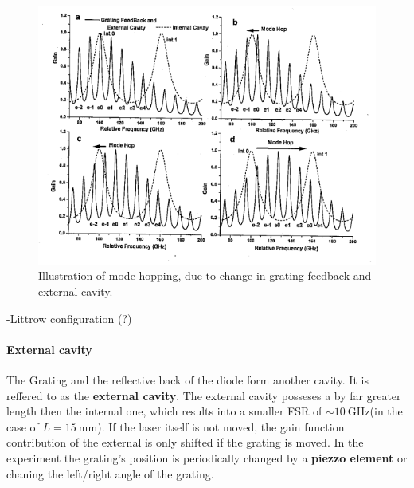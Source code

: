 \FloatBarrier
\begin{figure}
  \includegraphics{mode_hops.png}
  \caption{Illustration of mode hopping, due to change in grating feedback and external cavity.\cite{sample}}
  \label{fig:mode_hops}
\end{figure}
\FloatBarrier


-Littrow configuration (?)


\paragraph{External cavity}
The Grating and the reflective back of the diode form another
cavity. It is reffered to as the \textbf{external cavity}.
The external cavity posseses a by far greater length then
the internal one, which results into a
smaller FSR of
$\sim \SI{10}{\giga\hertz}$(in the case of $L = \SI{15}{\milli\meter}$).
If the laser itself is not moved, the gain function
contribution of the external is only shifted if the grating
is moved. In the experiment the grating's position
is periodically changed by a \textbf{piezzo element} or chaning the left/right angle of the grating.







